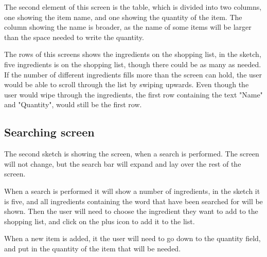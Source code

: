 The second element of this screen is the table, which is divided into two columns, one showing the item name, and one showing the quantity of the item. The column showing the name is broader, as the name of some items will be larger than the space needed to write the quantity.

The rows of this screens shows the ingredients on the shopping list, in the sketch, five ingredients is on the shopping list, though there could be as many as needed. If the number of different ingredients fills more than the screen can hold, the user would be able to scroll through the list by swiping upwards. Even though the user would wipe through the ingredients, the first row containing the text "Name" and "Quantity", would still be the first row.

\subsection{Searching screen}

The second sketch is showing the screen, when a search is performed. The screen will not change, but the search bar will expand and lay over the rest of the screen.

When a search is performed it will show a number of ingredients, in the sketch it is five, and all ingredients containing the word that have been searched for will be shown. Then the user will need to choose the ingredient they want to add to the shopping list, and click on the plus icon to add it to the list.

When a new item is added, it the user will need to go down to the quantity field, and put in the quantity of the item that will be needed.